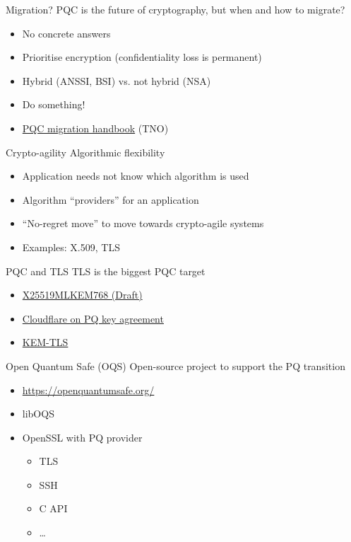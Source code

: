 \begin{frame}{Migration?}
  PQC is the future of cryptography, but when and how to migrate?
  \begin{itemize}[<+(1)->]
    \item No concrete answers
    \item Prioritise encryption (confidentiality loss is permanent)
    \item Hybrid (ANSSI, BSI) vs. not hybrid (NSA)
    \item Do something!
    \item \href{https://www.tno.nl/en/newsroom/2024/12/renewed-handbook-quantum-safe-crypto/}{PQC migration handbook} (TNO)
  \end{itemize}
\end{frame}

\begin{frame}{Crypto-agility}
  Algorithmic flexibility
  \begin{itemize}[<+(1)->]
    \item Application needs not know which algorithm is used
    \item Algorithm \enquote{providers} for an application
    \item \enquote{No-regret move} to move towards crypto-agile systems
    \item Examples: X.509, TLS 
  \end{itemize}
\end{frame}

\begin{frame}{PQC and TLS}
  TLS is the biggest PQC target
  \begin{itemize}[<+(1)->]
    \item \href{https://datatracker.ietf.org/doc/draft-kwiatkowski-tls-ecdhe-mlkem/}{X25519MLKEM768 (Draft)}
    \item \href{https://pq.cloudflareresearch.com}{Cloudflare on PQ key agreement}
    \item \href{https://blog.cloudflare.com/kemtls-post-quantum-tls-without-signatures/}{KEM-TLS}
  \end{itemize}
\end{frame}

\begin{frame}{Open Quantum Safe (OQS)}
  Open-source project to support the PQ transition
  \begin{itemize}[<+(1)->]
    \item \url{https://openquantumsafe.org/}
    \item libOQS
    \item OpenSSL with PQ provider
    \begin{itemize}
      \item TLS
      \item SSH
      \item C API
      \item \dots
    \end{itemize}
  \end{itemize}
\end{frame}

